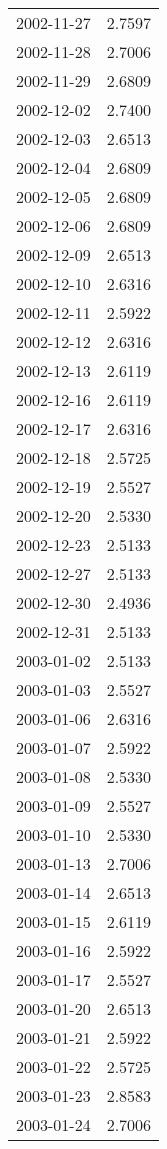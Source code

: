 \begin{tabular}{lr}
2002-11-27 &      2.7597 \\
2002-11-28 &      2.7006 \\
2002-11-29 &      2.6809 \\
2002-12-02 &      2.7400 \\
2002-12-03 &      2.6513 \\
2002-12-04 &      2.6809 \\
2002-12-05 &      2.6809 \\
2002-12-06 &      2.6809 \\
2002-12-09 &      2.6513 \\
2002-12-10 &      2.6316 \\
2002-12-11 &      2.5922 \\
2002-12-12 &      2.6316 \\
2002-12-13 &      2.6119 \\
2002-12-16 &      2.6119 \\
2002-12-17 &      2.6316 \\
2002-12-18 &      2.5725 \\
2002-12-19 &      2.5527 \\
2002-12-20 &      2.5330 \\
2002-12-23 &      2.5133 \\
2002-12-27 &      2.5133 \\
2002-12-30 &      2.4936 \\
2002-12-31 &      2.5133 \\
2003-01-02 &      2.5133 \\
2003-01-03 &      2.5527 \\
2003-01-06 &      2.6316 \\
2003-01-07 &      2.5922 \\
2003-01-08 &      2.5330 \\
2003-01-09 &      2.5527 \\
2003-01-10 &      2.5330 \\
2003-01-13 &      2.7006 \\
2003-01-14 &      2.6513 \\
2003-01-15 &      2.6119 \\
2003-01-16 &      2.5922 \\
2003-01-17 &      2.5527 \\
2003-01-20 &      2.6513 \\
2003-01-21 &      2.5922 \\
2003-01-22 &      2.5725 \\
2003-01-23 &      2.8583 \\
2003-01-24 &      2.7006 \\

\end{tabular}
